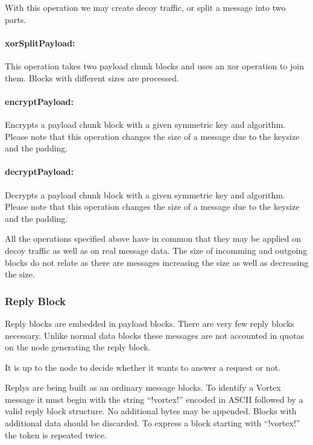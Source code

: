 With this operation we may create decoy traffic, or split a message into two parts.

\paragraph{xorSplitPayload:} This operation takes two payload chunk blocks and uses an xor operation to join them. Blocks with different sizes are processed.

\paragraph{encryptPayload:} Encrypts a payload chunk block with a given symmetric key and algorithm. Please note that this operation changes the size of a message due to the keysize and the padding.

\paragraph{decryptPayload:} Decrypts a payload chunk block with a given symmetric key and algorithm. Please note that this operation changes the size of a message due to the keysize and the padding.

All the operations specified above have in common that they may be applied on decoy traffic as well as on real message data. The size of incomming and outgoing blocks do not relate as there are messages increasing the size as well as decreasing the size.

\subsubsection{Reply Block\label{sec:replyBlock}}
Reply blocks are embedded in payload blocks. There are very few reply blocks necessary. Unlike normal data blocks these messages are not accounted in quotas on the node generating the reply block. 

It is up to the node to decide whether it wants to answer a request or not.

Replys are being built as an ordinary message blocks. To identify a Vortex message it must begin with the string ``!vortex!'' encoded in ASCII followed by a valid reply block structure. No additional bytes may be appended. Blocks with additional data should be discarded. To express a block starting with ``!vortex!'' the token is repeated twice.


